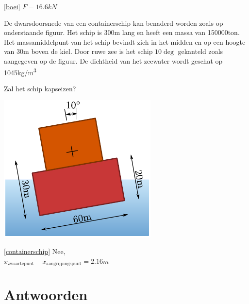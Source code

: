 \begin{antwoord}{\ref{boei}}
	$F = 16.6\unit{kN}$ 
\end{antwoord}
\begin{toepassing}
	\label{containerschip}
De dwarsdoorsnede van een containerschip kan benaderd worden zoals op onderstaande figuur. Het schip is 300m lang en heeft een massa van 150000ton. Het massamiddelpunt van het schip bevindt zich in het midden en op een hoogte van 30m boven de kiel. Door ruwe zee is het schip $10\deg$ gekanteld zoals aangegeven op de figuur. De dichtheid van het zeewater wordt geschat op 1045\unit{kg/m^3}
		
Zal het schip kapseizen?
		
	\centering
	\includegraphics{fig/hydrostatica/containerschip}
\end{toepassing}
\begin{antwoord}{\ref{containerschip}}
	Nee,\\ $x_\text{zwaartepunt}-x_\text{aangrijpingspunt} = 2.16\unit{m}$
\end{antwoord}
	
\section*{Antwoorden}
	\begin{multicols}{2}
	\end{multicols}